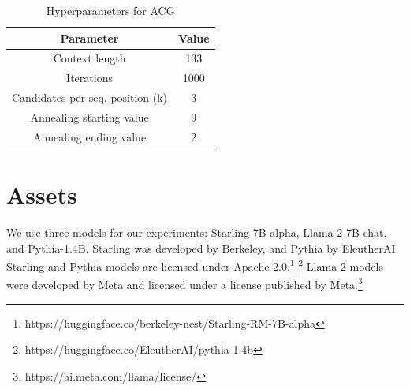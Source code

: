 \documentclass{article}
\theoremstyle{plain}
\theoremstyle{definition}
\theoremstyle{remark}
\begin{document}
\begin{table}
    \centering
    \caption{Hyperparameters for ACG}
    \label{tableh}
    \begin{tabular}{|c|c|}
        \hline
        Parameter & Value \\
        \hline
        Context length & 133 \\
        \hline
        Iterations & 1000 \\
        \hline
        Candidates per seq. position (k) & 3 \\
        \hline
        Annealing starting value & 9 \\
        \hline
        Annealing ending value & 2 \\
        \hline
    \end{tabular}
\end{table}

\section{Assets}

We use three models for our experiments: Starling 7B-alpha, Llama 2 7B-chat, and Pythia-1.4B. Starling was developed by Berkeley, and Pythia by EleutherAI. Starling and Pythia models are licensed under Apache-2.0.\footnote{https://huggingface.co/berkeley-nest/Starling-RM-7B-alpha} \footnote{https://huggingface.co/EleutherAI/pythia-1.4b} Llama 2 models were developed by Meta and licensed under a license published by Meta.\footnote{https://ai.meta.com/llama/license/} 

\end{document}
